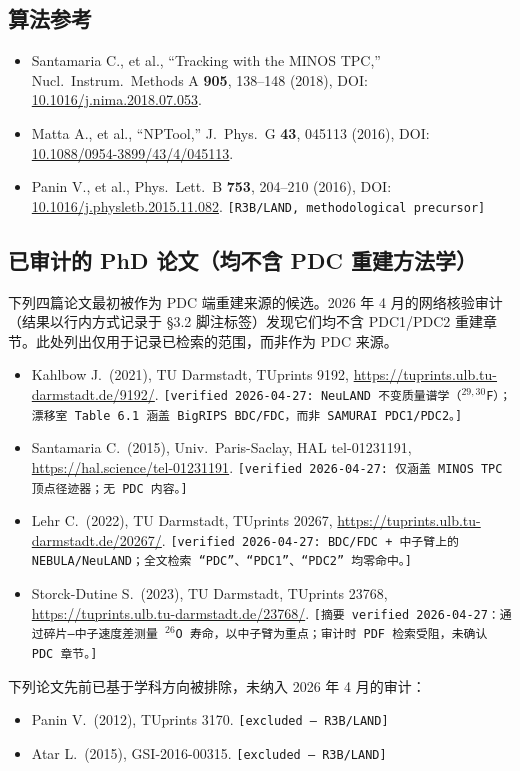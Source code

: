 \documentclass[a4paper, 11pt]{article}
\begin{document}
\subsection{算法参考}
\begin{itemize}
  \item Santamaria C., et al., ``Tracking with the MINOS TPC,'' Nucl.\ Instrum.\ Methods A \textbf{905}, 138--148 (2018), DOI: \href{https://doi.org/10.1016/j.nima.2018.07.053}{10.1016/j.nima.2018.07.053}.
  \item Matta A., et al., ``NPTool,'' J.\ Phys.\ G \textbf{43}, 045113 (2016), DOI: \href{https://doi.org/10.1088/0954-3899/43/4/045113}{10.1088/0954-3899/43/4/045113}.
  \item Panin V., et al., Phys.\ Lett.\ B \textbf{753}, 204--210 (2016), DOI: \href{https://doi.org/10.1016/j.physletb.2015.11.082}{10.1016/j.physletb.2015.11.082}. \texttt{[R3B/LAND, methodological precursor]}
\end{itemize}

\subsection{已审计的 PhD 论文（均不含 PDC 重建方法学）}
下列四篇论文最初被作为 PDC 端重建来源的候选。2026 年 4 月的网络核验审计（结果以行内方式记录于 §3.2 脚注标签）发现它们均不含 PDC1/PDC2 重建章节。此处列出仅用于记录已检索的范围，而非作为 PDC 来源。
\begin{itemize}
  \item Kahlbow J.\ (2021), TU Darmstadt, TUprints 9192, \url{https://tuprints.ulb.tu-darmstadt.de/9192/}. \texttt{[verified 2026-04-27: NeuLAND 不变质量谱学（$^{29,30}$F）；漂移室 Table~6.1 涵盖 BigRIPS BDC/FDC，而非 SAMURAI PDC1/PDC2。]}
  \item Santamaria C.\ (2015), Univ.\ Paris-Saclay, HAL tel-01231191, \url{https://hal.science/tel-01231191}. \texttt{[verified 2026-04-27: 仅涵盖 MINOS TPC 顶点径迹器；无 PDC 内容。]}
  \item Lehr C.\ (2022), TU Darmstadt, TUprints 20267, \url{https://tuprints.ulb.tu-darmstadt.de/20267/}. \texttt{[verified 2026-04-27: BDC/FDC + 中子臂上的 NEBULA/NeuLAND；全文检索 ``PDC''、``PDC1''、``PDC2'' 均零命中。]}
  \item Storck-Dutine S.\ (2023), TU Darmstadt, TUprints 23768, \url{https://tuprints.ulb.tu-darmstadt.de/23768/}. \texttt{[摘要 verified 2026-04-27：通过碎片—中子速度差测量 $^{26}$O 寿命，以中子臂为重点；审计时 PDF 检索受阻，未确认 PDC 章节。]}
\end{itemize}
下列论文先前已基于学科方向被排除，未纳入 2026 年 4 月的审计：
\begin{itemize}
  \item Panin V.\ (2012), TUprints 3170. \texttt{[excluded --- R3B/LAND]}
  \item Atar L.\ (2015), GSI-2016-00315. \texttt{[excluded --- R3B/LAND]}
\end{itemize}
\end{document}

